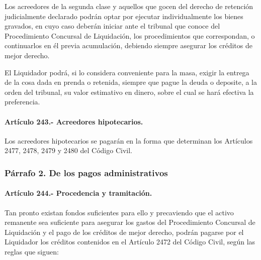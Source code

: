 \documentclass[
]{book}
\begin{document}
Los acreedores de la segunda clase y aquellos que gocen del derecho de retención judicialmente declarado podrán optar por ejecutar individualmente los bienes gravados, en cuyo caso deberán iniciar ante el tribunal que conoce del Procedimiento Concursal de Liquidación, los procedimientos que correspondan, o continuarlos en él previa acumulación, debiendo siempre asegurar los créditos de mejor derecho.

El Liquidador podrá, si lo considera conveniente para la masa, exigir la entrega de la cosa dada en prenda o retenida, siempre que pague la deuda o deposite, a la orden del tribunal, su valor estimativo en dinero, sobre el cual se hará efectiva la preferencia.

\hypertarget{artuxedculo-243.--acreedores-hipotecarios.}{%
\paragraph*{Artículo 243.- Acreedores hipotecarios.}\label{artuxedculo-243.--acreedores-hipotecarios.}}

Los acreedores hipotecarios se pagarán en la forma que determinan los Artículos 2477, 2478, 2479 y 2480 del Código Civil.

\hypertarget{puxe1rrafo-2.-de-los-pagos-administrativos}{%
\subsubsection*{Párrafo 2. De los pagos administrativos}\label{puxe1rrafo-2.-de-los-pagos-administrativos}}

\hypertarget{artuxedculo-244.--procedencia-y-tramitaciuxf3n.}{%
\paragraph*{Artículo 244.- Procedencia y tramitación.}\label{artuxedculo-244.--procedencia-y-tramitaciuxf3n.}}

Tan pronto existan fondos suficientes para ello y precaviendo que el activo remanente sea suficiente para asegurar los gastos del Procedimiento Concursal de Liquidación y el pago de los créditos de mejor derecho, podrán pagarse por el Liquidador los créditos contenidos en el Artículo 2472 del Código Civil, según las reglas que siguen:
\end{document}
